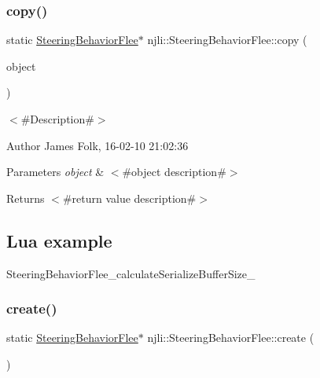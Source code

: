 \subsubsection{\texorpdfstring{copy()}{copy()}}
{\footnotesize\ttfamily static \mbox{\hyperlink{classnjli_1_1_steering_behavior_flee}{Steering\+Behavior\+Flee}}$\ast$ njli\+::\+Steering\+Behavior\+Flee\+::copy (\begin{DoxyParamCaption}\item[{const \mbox{\hyperlink{classnjli_1_1_steering_behavior_flee}{Steering\+Behavior\+Flee}} \&}]{object }\end{DoxyParamCaption})\hspace{0.3cm}{\ttfamily [static]}}



$<$\#\+Description\#$>$ 

\begin{DoxyAuthor}{Author}
James Folk, 16-\/02-\/10 21\+:02\+:36
\end{DoxyAuthor}

\begin{DoxyParams}{Parameters}
{\em object} & $<$\#object description\#$>$\\
\hline
\end{DoxyParams}
\begin{DoxyReturn}{Returns}
$<$\#return value description\#$>$
\end{DoxyReturn}
\hypertarget{classnjli_1_1_steering_behavior_wander_ex1}{}\subsection{Lua example}\label{classnjli_1_1_steering_behavior_wander_ex1}

\begin{DoxyCodeInclude}
\end{DoxyCodeInclude}
Steering\+Behavior\+Flee\+\_\+calculate\+Serialize\+Buffer\+Size\+\_\+ \mbox{\label{classnjli_1_1_steering_behavior_flee_aeb7779c2210d42ebe0eaee865063c6c9}} 
\subsubsection{\texorpdfstring{create()}{create()}\hspace{0.1cm}{\footnotesize\ttfamily [1/2]}}
{\footnotesize\ttfamily static \mbox{\hyperlink{classnjli_1_1_steering_behavior_flee}{Steering\+Behavior\+Flee}}$\ast$ njli\+::\+Steering\+Behavior\+Flee\+::create (\begin{DoxyParamCaption}{ }\end{DoxyParamCaption})\hspace{0.3cm}{\ttfamily [static]}}



